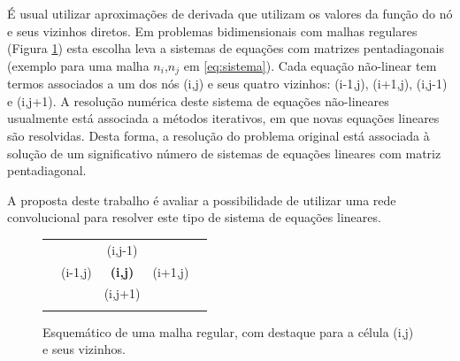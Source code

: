 \documentclass[final,5p]{elsarticle}
\numberwithin{equation}{section}
\begin{document}
    É usual utilizar aproximações de derivada que utilizam os valores da função do nó e seus vizinhos diretos. Em problemas bidimensionais com malhas regulares (Figura \ref{fig:esquematico}) esta escolha leva a sistemas de equações com matrizes pentadiagonais (exemplo para uma malha $n_i$,$n_j$ em \ref{eq:sistema}). Cada equação não-linear tem termos associados a um dos nós (i,j) e seus quatro vizinhos: (i-1,j), (i+1,j), (i,j-1) e (i,j+1). A resolução numérica deste sistema de equações não-lineares usualmente está associada a métodos iterativos, em que novas equações lineares são resolvidas. Desta forma, a resolução do problema original está associada à solução de um significativo número de sistemas de equações lineares com matriz pentadiagonal.

    A proposta deste trabalho é avaliar a possibilidade de utilizar uma rede convolucional para resolver este tipo de sistema de equações lineares.

    \begin{figure}
    \begin{center}
        \begin{tabular}{c|c|c|c|c}
            & &  & & \\
            \hline
            & & (i,j-1) & & \\
            \hline
            & (i-1,j) & \textbf{(i,j)} & (i+1,j) & \\
            \hline
            & & (i,j+1) & & \\
            \hline
            & &  & & \\
        \end{tabular}
        \caption{Esquemático de uma malha regular, com destaque para a célula (i,j) e seus vizinhos.}
        \label{fig:esquematico}
    \end{center}
    \end{figure}
\end{document}
